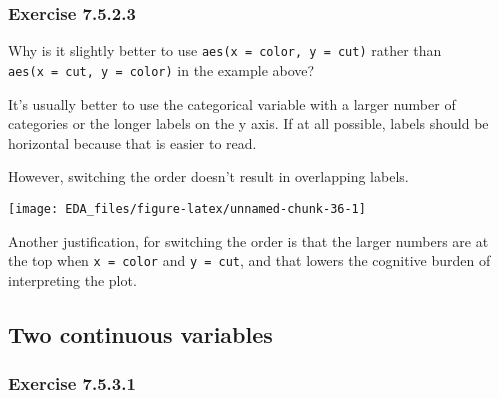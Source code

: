 \documentclass[]{book}
\newenvironment{Shaded}{\begin{snugshade}}{\end{snugshade}}
\newcommand{\DataTypeTok}[1]{\textcolor[rgb]{0.13,0.29,0.53}{#1}}
\newcommand{\KeywordTok}[1]{\textcolor[rgb]{0.13,0.29,0.53}{\textbf{#1}}}
\newcommand{\NormalTok}[1]{#1}
\newcommand{\OperatorTok}[1]{\textcolor[rgb]{0.81,0.36,0.00}{\textbf{#1}}}
\newcommand{\StringTok}[1]{\textcolor[rgb]{0.31,0.60,0.02}{#1}}
\theoremstyle{plain}
\theoremstyle{remark}
\theoremstyle{definition}
\theoremstyle{definition}
\theoremstyle{definition}
\theoremstyle{remark}
\begin{document}
\hypertarget{exercise-7.5.2.3}{%
\subsubsection*{\texorpdfstring{Exercise
{7.5.2.3}}{Exercise 7.5.2.3}}\label{exercise-7.5.2.3}}

Why is it slightly better to use \texttt{aes(x\ =\ color,\ y\ =\ cut)}
rather than \texttt{aes(x\ =\ cut,\ y\ =\ color)} in the example above?

It's usually better to use the categorical variable with a larger number
of categories or the longer labels on the y axis. If at all possible,
labels should be horizontal because that is easier to read.

However, switching the order doesn't result in overlapping labels.

\begin{Shaded}
\end{Shaded}

\begin{center}\texttt{[image: EDA\_files/figure-latex/unnamed-chunk-36-1]} \end{center}

Another justification, for switching the order is that the larger
numbers are at the top when \texttt{x\ =\ color} and \texttt{y\ =\ cut},
and that lowers the cognitive burden of interpreting the plot.

\hypertarget{two-continuous-variables}{%
\subsection{Two continuous variables}\label{two-continuous-variables}}

\hypertarget{exercise-7.5.3.1}{%
\subsubsection*{\texorpdfstring{Exercise
{7.5.3.1}}{Exercise 7.5.3.1}}\label{exercise-7.5.3.1}}
\end{document}
